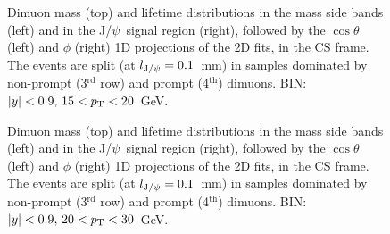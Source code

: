 \documentclass[12pt]{article}
\newcommand{\JPsi}{J/$\psi$}
\begin{document}

\begin{figure}[htbp]
\centering
{}
\caption{Dimuon mass (top) and lifetime distributions in the mass side bands 
(left) and in the \JPsi\ signal region (right), followed by the
$\cos\theta$ (left) and $\phi$ (right) 1D projections of the 2D fits,
in the CS frame. The events are split (at $l_{{\rm J}/\psi} = 0.1$~mm) 
in samples dominated by non-prompt (3$^\mathrm{rd}$ row) and 
prompt (4$^\mathrm{th}$) dimuons. BIN: $|y|<0.9,\, 15 < p_{\rm T} < 20$~GeV.}
\end{figure}
\clearpage

\begin{figure}[htbp]
\centering
{}
\caption{Dimuon mass (top) and lifetime distributions in the mass side bands 
(left) and in the \JPsi\ signal region (right), followed by the
$\cos\theta$ (left) and $\phi$ (right) 1D projections of the 2D fits,
in the CS frame. The events are split (at $l_{{\rm J}/\psi} = 0.1$~mm) 
in samples dominated by non-prompt (3$^\mathrm{rd}$ row) and 
prompt (4$^\mathrm{th}$) dimuons. BIN: $|y|<0.9,\, 20 < p_{\rm T} < 30$~GeV.}
\end{figure}
\clearpage

\end{document}
